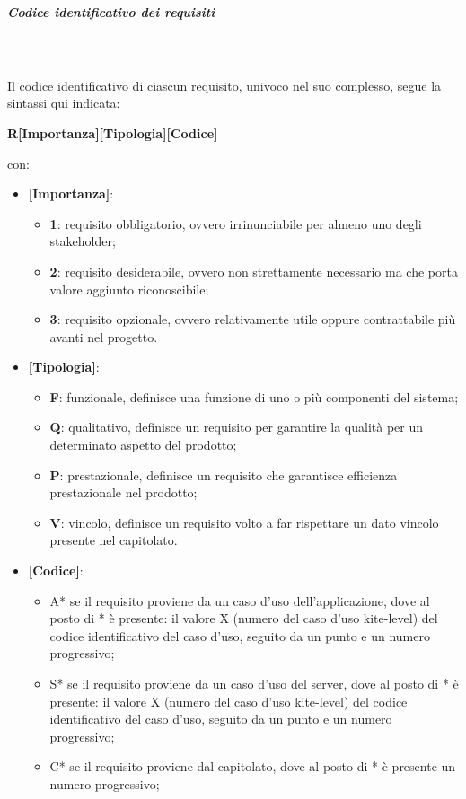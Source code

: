 \subparagraph*{Codice identificativo dei requisiti}\mbox{}\\ \\
Il codice identificativo di ciascun requisito, univoco nel suo complesso, segue la sintassi qui indicata:
\begin{center}
	\textbf{R[Importanza][Tipologia][Codice]}
\end{center}
con:
\begin{itemize}
	\item \textbf{[Importanza]}:
	\begin{itemize}
		\item \textbf{1}: requisito obbligatorio, ovvero irrinunciabile per almeno uno degli stakeholder;
		\item \textbf{2}: requisito desiderabile, ovvero non strettamente necessario ma che porta valore aggiunto riconoscibile;
		\item \textbf{3}: requisito opzionale, ovvero relativamente utile oppure contrattabile più avanti nel progetto.
	\end{itemize}
	\item \textbf{[Tipologia]}:
	\begin{itemize}
		\item \textbf{F}: funzionale, definisce una funzione di uno o più componenti del sistema;
		\item \textbf{Q}: qualitativo, definisce un requisito per garantire la qualità per un determinato aspetto del prodotto;
		\item \textbf{P}: prestazionale, definisce un requisito che garantisce efficienza prestazionale nel prodotto;
		\item \textbf{V}: vincolo, definisce un requisito volto a far rispettare un dato vincolo presente nel capitolato.
	\end{itemize}
	\item \textbf{[Codice]}:
	\begin{itemize}
		\item A* se il requisito proviene da un caso d'uso dell'applicazione, dove al posto di * è presente: il valore X (numero del caso d'uso kite-level) del codice identificativo del caso d'uso, seguito da un punto e un numero progressivo;
		\item S* se il requisito proviene da un caso d'uso del server, dove al posto di * è presente: il valore X (numero del caso d'uso kite-level) del codice identificativo del caso d'uso, seguito da un punto e un numero progressivo;
		\item C* se il requisito proviene dal capitolato, dove al posto di * è presente un numero progressivo;

\end{itemize}
\end{itemize}
